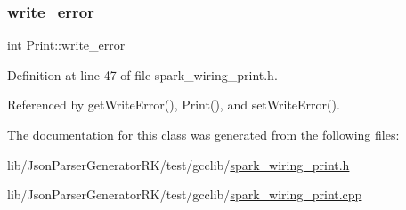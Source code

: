 \subsubsection{\texorpdfstring{write\+\_\+error}{write\_error}}
{\footnotesize\ttfamily int Print\+::write\+\_\+error\hspace{0.3cm}{\ttfamily [private]}}



Definition at line 47 of file spark\+\_\+wiring\+\_\+print.\+h.



Referenced by get\+Write\+Error(), Print(), and set\+Write\+Error().



The documentation for this class was generated from the following files\+:\begin{DoxyCompactItemize}
\item 
lib/\+Json\+Parser\+Generator\+R\+K/test/gcclib/\hyperlink{test_2gcclib_2spark__wiring__print_8h}{spark\+\_\+wiring\+\_\+print.\+h}\item 
lib/\+Json\+Parser\+Generator\+R\+K/test/gcclib/\hyperlink{spark__wiring__print_8cpp}{spark\+\_\+wiring\+\_\+print.\+cpp}\end{DoxyCompactItemize}
